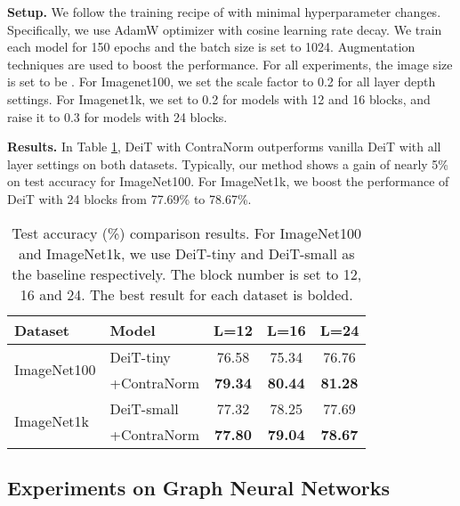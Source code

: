 \documentclass{article}
\theoremstyle{definition}
\theoremstyle{remark}
\theoremstyle{theorem}
\begin{document}
\textbf{Setup.} 
We follow the training recipe of \citet{touvron2021training} with minimal hyperparameter changes. Specifically, we use AdamW \citep{loshchilov2017decoupled} optimizer with cosine learning rate decay. We train each model for 150 epochs and the batch size is set to 1024. Augmentation techniques are used to boost the performance. For all experiments, the image size is set to be . For Imagenet100, we set the scale factor  to 0.2 for all layer depth settings. For Imagenet1k, we set  to 0.2 for models with 12 and 16 blocks, and raise it to 0.3 for models with 24 blocks.

\textbf{Results.} In Table \ref{table:vit-acc}, DeiT with ContraNorm outperforms vanilla DeiT with all layer settings on both datasets. Typically, our method shows a gain of nearly 5\% on test accuracy for ImageNet100. For ImageNet1k, we boost the performance of DeiT with 24 blocks from 77.69\% to 78.67\%.


\begin{table}[!t]
	\centering
	\caption{Test accuracy (\%) comparison results. For ImageNet100 and ImageNet1k, we use DeiT-tiny and DeiT-small as the baseline respectively. The block number is set to 12, 16 and 24. The best result for each dataset is bolded.}
	\vspace{-0.13 in}
	\begin{tabular}{ll ccc}
		\toprule
		Dataset & Model & L=12 & L=16 & L=24 \\
		\midrule
		\multirow{2}{*}{ImageNet100} & DeiT-tiny & 76.58 & 75.34 & 76.76 \\
		~ & +ContraNorm  & \bf79.34 & \bf80.44 & \bf81.28 \\
		\midrule
		\multirow{2}{*}{ImageNet1k} & DeiT-small & 77.32 & 78.25 & 77.69 \\
		~ & +ContraNorm & \bf77.80 & \bf79.04 & \bf78.67 \\
		\bottomrule    
	\end{tabular}
	\label{table:vit-acc}
 \vspace{-0.1 in}
\end{table}


\subsection{Experiments on Graph Neural Networks}
\end{document}
